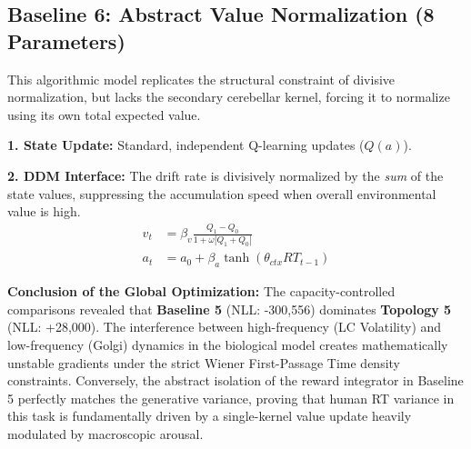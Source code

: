 ﻿\documentclass[12pt]{article}
\begin{document}
\subsection{Baseline 6: Abstract Value Normalization (8 Parameters)}
This algorithmic model replicates the structural constraint of divisive normalization, but lacks the secondary cerebellar kernel, forcing it to normalize using its own total expected value.

\textbf{1. State Update:}
Standard, independent Q-learning updates ($Q(a)$).

\textbf{2. DDM Interface:}
The drift rate is divisively normalized by the \textit{sum} of the state values, suppressing the accumulation speed when overall environmental value is high.
\begin{align}
    v_t &= \beta_v \frac{Q_1 - Q_0}{1 + \omega |Q_1 + Q_0|} \\
    a_t &= a_0 + \beta_a \tanh(\theta_{ctx} RT_{t-1})
\end{align}

\vspace{1cm}
\begin{mdframed}[backgroundcolor=gray!10]
\textbf{Conclusion of the Global Optimization:}
The capacity-controlled comparisons revealed that \textbf{Baseline 5} (NLL: -300,556) dominates \textbf{Topology 5} (NLL: +28,000). The interference between high-frequency (LC Volatility) and low-frequency (Golgi) dynamics in the biological model creates mathematically unstable gradients under the strict Wiener First-Passage Time density constraints. Conversely, the abstract isolation of the reward integrator in Baseline 5 perfectly matches the generative variance, proving that human RT variance in this task is fundamentally driven by a single-kernel value update heavily modulated by macroscopic arousal.
\end{mdframed}
\end{document}
